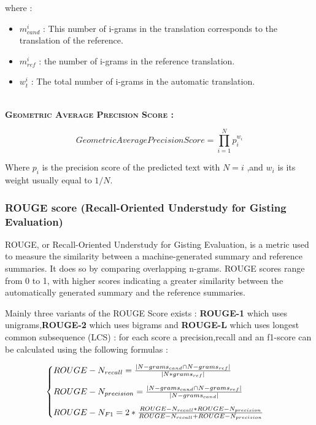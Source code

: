 \documentclass[a4paper,10pt]{article}
\begin{document}
\noindent where : 

\begin{itemize}
    \item $m_{cand}^{i}$  : This number of i-grams in the translation corresponds to the translation of the reference.
    \item $m_{ref}^{i}$ : the number of i-grams in the reference translation.
    \item $w_{t}^{i}$ : The total number of i-grams in the automatic translation.
\end{itemize}

\noindent\textbf{\scshape{\\ Geometric Average Precision Score : \\}}

$$
Geometric Average Precision Score = \prod\limits_{i=1}^{N} p_{i} ^ {w_{i}}
$$

\noindent Where $p_{i}$ is the precision score of the predicted text with $N = i$ ,and $w_{i}$ is its weight usually equal to $1 / N$.

\subsubsection{ROUGE score (Recall-Oriented Understudy for Gisting Evaluation)}

\noindent ROUGE, or Recall-Oriented Understudy for Gisting Evaluation, is a metric used to measure the similarity between a machine-generated summary and reference summaries. It does so by comparing overlapping n-grams. ROUGE scores range from 0 to 1, with higher scores indicating a greater similarity between the automatically generated summary and the reference summaries.

\noindent Mainly three variants of the ROUGE Score exists : \textbf{ROUGE-1} which uses unigrams,\textbf{ROUGE-2} which uses bigrams and \textbf{ROUGE-L} which uses longest common subsequence (LCS) : for each score a precision,recall and an f1-score can be calculated using the following formulas : 

$$
\begin{cases}
    ROUGE-N_{recall} = \frac{\mid N-grams_{cand} \cap N-grams_{ref} \mid}{\mid 
 N*grams_{ref} \mid}\\
 \noalign{\vskip9pt}
 ROUGE-N_{precision} = \frac{\mid N-grams_{cand} \cap N-grams_{ref} \mid}{\mid 
 N-grams_{cand} \mid}\\
 \noalign{\vskip9pt}
 ROUGE-N_{F1} = 2 * \frac{ROUGE-N_{recall} * ROUGE-N_{precision}}{ROUGE-N_{recall} + ROUGE-N_{precision}}
\end{cases}
$$
\end{document}
